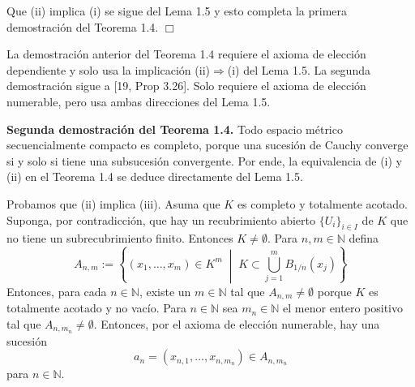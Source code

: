 Que (ii) implica (i) se sigue del Lema 1.5 y esto completa la primera demostración del Teorema 1.4. \hfill $\Box$

La demostración anterior del Teorema 1.4 requiere el axioma de elección dependiente y solo usa la implicación (ii)$\Rightarrow$(i) del Lema 1.5. La segunda demostración sigue a [19, Prop 3.26]. Solo requiere el axioma de elección numerable, pero usa ambas direcciones del Lema 1.5.

\noindent \textbf{Segunda demostración del Teorema 1.4.} Todo espacio métrico secuencialmente compacto es completo, porque una sucesión de Cauchy converge si y solo si tiene una subsucesión convergente. Por ende, la equivalencia de (i) y (ii) en el Teorema 1.4 se deduce directamente del Lema 1.5.

Probamos que (ii) implica (iii). Asuma que $K$ es completo y totalmente acotado. Suponga, por contradicción, que hay un recubrimiento abierto $\{U_{i}\}_{i\in I}$ de $K$ que no tiene un subrecubrimiento finito. Entonces $K\ne\emptyset$. Para $n, m\in\mathbb{N}$ defina
\[ A_{n,m} := \left\{(x_{1},\dots,x_{m})\in K^{m} \;\middle|\; K\subset\bigcup_{j=1}^{m}B_{1/n}(x_{j})\right\} \]
Entonces, para cada $n\in\mathbb{N}$, existe un $m\in\mathbb{N}$ tal que $A_{n,m}\ne\emptyset$ porque $K$ es totalmente acotado y no vacío. Para $n\in\mathbb{N}$ sea $m_{n}\in\mathbb{N}$ el menor entero positivo tal que $A_{n,m_{n}}\ne\emptyset$. Entonces, por el axioma de elección numerable, hay una sucesión
\[ a_{n}=(x_{n,1},\dots,x_{n,m_{n}})\in A_{n,m_{n}} \]
para $n\in\mathbb{N}$.

